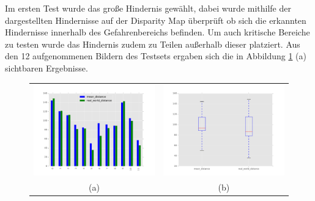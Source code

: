     \noindent
	Im ersten Test wurde das große Hindernis gewählt, dabei wurde mithilfe der dargestellten Hindernisse auf der Disparity Map überprüft ob sich die erkannten Hindernisse innerhalb des Gefahrenbereichs befinden. Um auch kritische Bereiche zu testen wurde das Hindernis zudem zu Teilen außerhalb dieser platziert. Aus den 12 aufgenommenen Bildern des Testsets ergaben sich die in Abbildung \ref{fig:eval_big} (a) sichtbaren Ergebnisse.\\
    
		    
	\begin{figure}[h]
		\centering
		\begin{tabular}{cc}
		\includegraphics[width=7cm]{img/evaluation/big_bar}&
		\includegraphics[width=7cm]{img/evaluation/big_box}\\
		 (a) & (b)
		\end{tabular}
		\caption{}
	    \label{fig:eval_big}
	\end{figure}
	
